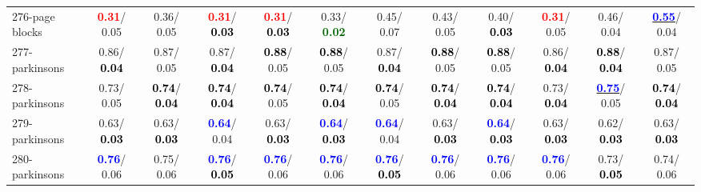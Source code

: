 \begin{table}[h]
\begin{center}
{\begin{tabular}{lc|c|c|c|c|c|c|c|c|c|c}
276-page blocks & \textcolor{red}{\textbf{  0.31}}/  0.05 &   0.36/  0.05 & \textcolor{red}{\textbf{  0.31}}/\textcolor{black}{\textbf{  0.03}} & \textcolor{red}{\textbf{  0.31}}/\textcolor{black}{\textbf{  0.03}} &   0.33/\textcolor{darkgreen}{\textbf{  0.02}} &   0.45/  0.07 &   0.43/  0.05 &   0.40/\textcolor{black}{\textbf{  0.03}} & \textcolor{red}{\textbf{  0.31}}/  0.05 &   0.46/  0.04 & \underline{\textcolor{blue}{\textbf{  0.55}}}/  0.04 \\
277-parkinsons &   0.86/\textcolor{black}{\textbf{  0.04}} &   0.87/  0.05 &   0.87/\textcolor{black}{\textbf{  0.04}} & \textcolor{black}{\textbf{  0.88}}/  0.05 & \textcolor{black}{\textbf{  0.88}}/  0.05 &   0.87/\textcolor{black}{\textbf{  0.04}} & \textcolor{black}{\textbf{  0.88}}/  0.05 & \textcolor{black}{\textbf{  0.88}}/  0.05 &   0.86/\textcolor{black}{\textbf{  0.04}} & \textcolor{black}{\textbf{  0.88}}/\textcolor{black}{\textbf{  0.04}} &   0.87/  0.05 \\ \hline
278-parkinsons &   0.73/  0.05 & \textcolor{black}{\textbf{  0.74}}/\textcolor{black}{\textbf{  0.04}} & \textcolor{black}{\textbf{  0.74}}/\textcolor{black}{\textbf{  0.04}} & \textcolor{black}{\textbf{  0.74}}/  0.05 & \textcolor{black}{\textbf{  0.74}}/\textcolor{black}{\textbf{  0.04}} & \textcolor{black}{\textbf{  0.74}}/  0.05 & \textcolor{black}{\textbf{  0.74}}/\textcolor{black}{\textbf{  0.04}} & \textcolor{black}{\textbf{  0.74}}/\textcolor{black}{\textbf{  0.04}} &   0.73/\textcolor{black}{\textbf{  0.04}} & \underline{\textcolor{blue}{\textbf{  0.75}}}/  0.05 & \textcolor{black}{\textbf{  0.74}}/\textcolor{black}{\textbf{  0.04}} \\
279-parkinsons &   0.63/\textcolor{black}{\textbf{  0.03}} &   0.63/\textcolor{black}{\textbf{  0.03}} & \textcolor{blue}{\textbf{  0.64}}/  0.04 &   0.63/\textcolor{black}{\textbf{  0.03}} & \textcolor{blue}{\textbf{  0.64}}/\textcolor{black}{\textbf{  0.03}} & \textcolor{blue}{\textbf{  0.64}}/  0.04 &   0.63/\textcolor{black}{\textbf{  0.03}} & \textcolor{blue}{\textbf{  0.64}}/\textcolor{black}{\textbf{  0.03}} &   0.63/\textcolor{black}{\textbf{  0.03}} &   0.62/\textcolor{black}{\textbf{  0.03}} &   0.63/\textcolor{black}{\textbf{  0.03}} \\
280-parkinsons & \textcolor{blue}{\textbf{  0.76}}/  0.06 &   0.75/  0.06 & \textcolor{blue}{\textbf{  0.76}}/\textcolor{black}{\textbf{  0.05}} & \textcolor{blue}{\textbf{  0.76}}/  0.06 & \textcolor{blue}{\textbf{  0.76}}/  0.06 & \textcolor{blue}{\textbf{  0.76}}/\textcolor{black}{\textbf{  0.05}} & \textcolor{blue}{\textbf{  0.76}}/  0.06 & \textcolor{blue}{\textbf{  0.76}}/  0.06 & \textcolor{blue}{\textbf{  0.76}}/  0.06 &   0.73/\textcolor{black}{\textbf{  0.05}} &   0.74/  0.06 \\

\end{tabular}}
\end{center}
\end{table}
